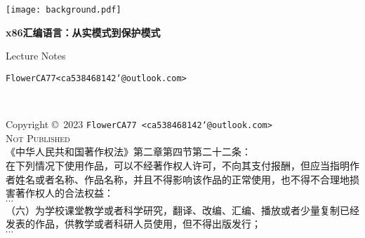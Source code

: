\documentclass[
	11pt, %
	a4paper, %
]{LegrandOrangeBook}
\begin{document}

\titlepage %
	{\texttt{[image: background.pdf]}} %
	{ %
		\centering\sffamily %
		{\Huge\bfseries x86汇编语言：从实模式到保护模式\par} %
		\vspace{16pt} %
		{\huge Lecture Notes\par} %
		\vspace{24pt} %
		{\Large\texttt{FlowerCA77\quad <ca538468142\char`@outlook.com>}\par} %
	}


\thispagestyle{empty} %

~\vfill %

\noindent Copyright \copyright\ 2023 \texttt{FlowerCA77 <ca538468142\char`@outlook.com>}\\ %

\noindent \textsc{Not Published}\\ %

\noindent 《中华人民共和国著作权法》第二章第四节第二十二条：\\
在下列情况下使用作品，可以不经著作权人许可，不向其支付报酬，但应当指明作者姓名或者名称、作品名称，并且不得影响该作品的正常使用，也不得不合理地损害著作权人的合法权益：\\
$\cdots$\\
（六）为学校课堂教学或者科学研究，翻译、改编、汇编、播放或者少量复制已经发表的作品，供教学或者科研人员使用，但不得出版发行；\\
$\cdots$\\ %

\end{document}
